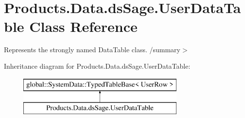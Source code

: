 \hypertarget{class_products_1_1_data_1_1ds_sage_1_1_user_data_table}{}\section{Products.\+Data.\+ds\+Sage.\+User\+Data\+Table Class Reference}
\label{class_products_1_1_data_1_1ds_sage_1_1_user_data_table}


Represents the strongly named Data\+Table class. /summary$>$  


Inheritance diagram for Products.\+Data.\+ds\+Sage.\+User\+Data\+Table\+:\begin{figure}[H]
\begin{center}
\leavevmode
\includegraphics[height=2.000000cm]{class_products_1_1_data_1_1ds_sage_1_1_user_data_table}
\end{center}
\end{figure}
